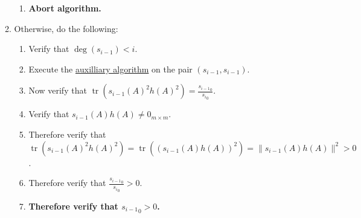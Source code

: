 \documentclass[twocolumn]{article}
\DeclareMathOperator{\tr}{tr}
\begin{document}
\begin{enumerate}
\begin{enumerate}
\begin{enumerate}
						\item \textbf{Abort algorithm.}
					\end{enumerate}
					\item Otherwise, do the following:
					\begin{enumerate}
						\item Verify that $\deg(s_{i-1})<i$.
						\item Execute the \hyperref[sec:algorithm 47 auxilliary algorithm]{auxilliary algorithm} on the pair $(s_{i-1}, s_{i-1})$.
						\item Now verify that $\tr(s_{i-1}(A)^2h(A)^2)=\frac{{s_{i-1}}_0}{{s_i}_0}$.
						\item Verify that $s_{i-1}(A)h(A)\ne 0_{m\times m}$.
						\item Therefore verify that $\tr(s_{i-1}(A)^2h(A)^2)=\tr((s_{i-1}(A)h(A))^2)=\lVert s_{i-1}(A)h(A)\rVert^2>0$.
						\item Therefore verify that $\frac{{s_{i-1}}_0}{{s_i}_0}>0$.
						\item \textbf{Therefore verify that ${s_{i-1}}_0>0$.}
					\end{enumerate}
				\end{enumerate}
			\end{enumerate}
\end{document}
